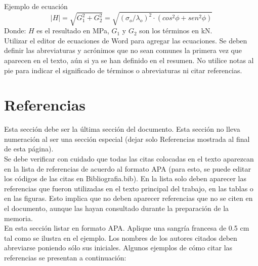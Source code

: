\documentclass[11pt,letterpaper]{article}
\begin{document}
Ejemplo de ecuación
\begin{equation}
    |H|=\sqrt{G_1^2+G_2^2}=\sqrt{(\sigma_o/\lambda_o)^2\cdot(cos^2\phi+sen^2\phi)}
    \label{eq: Ejemplo}
\end{equation}
Donde: $H$ es el resultado en MPa, $G_1$ y $G_2$ son los términos en kN.\\

Utilizar el editor de ecuaciones de Word para agregar las ecuaciones.
Se deben definir las abreviaturas y acrónimos que no sean comunes la primera vez que aparecen en el texto, aún si ya se han definido en el resumen.  No utilice notas al pie para indicar el significado de términos o abreviaturas ni citar referencias.


\section{Referencias}
Esta sección debe ser la última sección del documento. Esta sección no lleva numeración al ser una sección especial (dejar solo Referencias mostrada al final de esta página).\\

Se debe verificar con cuidado que todas las citas colocadas en el texto aparezcan en la lista de referencias de acuerdo al formato APA (para esto, se puede editar los códigos de las citas en Bibliografia.bib). En la lista solo deben aparecer las referencias que fueron utilizadas en el texto principal del trabajo, en las tablas o en las figuras. Esto implica que no deben aparecer referencias que no se citen en el documento, aunque las hayan consultado durante la preparación de la memoria.\\

En esta sección listar en formato APA. Aplique una sangría francesa de 0.5 cm tal como se ilustra en el ejemplo.  Los nombres de los autores citados deben abreviarse poniendo sólo sus iniciales. Algunos ejemplos de cómo citar las referencias se presentan a continuación:

\printbibliography
\end{document}

